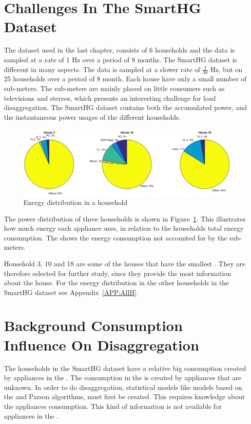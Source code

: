 \section{Challenges In The SmartHG Dataset} 
The  dataset used in the last chapter, consists of 6 households and the data is sampled at a rate of 1 Hz over a period of 8 months. The SmartHG dataset is different in many aspects. The data is sampled at a slower rate of $\frac{1}{30}$ Hz, but on 25 households over a period of 8 month. Each house have only a small number of sub-meters. The sub-meters are mainly placed on little consumers such as televisions and stereos, which presents an interesting challenge for load disaggregation. The SmartHG dataset contains both the accumulated power, and the instantaneous power usages of the different households.

\begin{figure}[H]
\centering
\includegraphics[width=1\textwidth]{billeder/TotalPie.png}
\caption{Energy distribution in a household}
\label{fig:SLC}
\end{figure}

The power distribution of three households is shown in Figure~\ref{fig:SLC}. This illustrates how much energy each appliance uses, in relation to the households total energy consumption. The  shows the energy consumption not accounted for by the sub-meters.  

Household 3, 10 and 18 are some of the houses that have the smallest . They are therefore selected for further study, since they provide the most information about the house. For the energy distribution in the other households in the SmartHG dataset see Appendix~\ref{APP:AllH}. 

\section{Background Consumption Influence On Disaggregation}
\label{sec:AppNoise}
The households in the SmartHG dataset have a relative big consumption created by appliances in the . The consumption in the  is created by appliances that are unknown. In order to do disaggregation, statistical models like models based on the  and Parson algorithms, must first be created. This requires knowledge about the appliances consumption. This kind of information is not available for appliances in the . 

